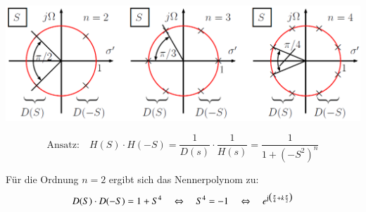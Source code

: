 \begin{center}
    \includegraphics[width=0.8\columnwidth]{images/filter_pollage_butterworth.png}
\end{center}



$$ \text{Ansatz:} \quad H(S) \cdot H(-S) = \frac{1}{D(s)} \cdot \frac{1}{H(s)} = \frac{1}{ 1 + (-S^2)^n} $$

Für die Ordnung $n = 2$ ergibt sich das Nennerpolynom zu:
$$ D(S) \cdot D(-S) = 1 + S^4 \quad \Leftrightarrow \quad S^4 = -1 \quad \Leftrightarrow \quad
    e^{\mathrm{j} \bigl( \frac{\pi}{4} + k \frac{\pi}{2} \bigr)}$$

